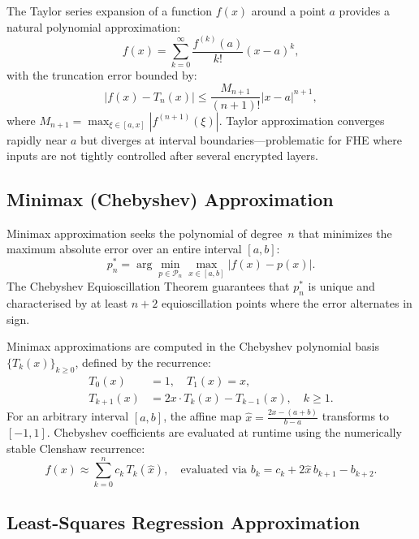 The Taylor series expansion of a function $f(x)$ around a point $a$ provides a natural polynomial approximation:
\begin{equation}
    f(x) = \sum_{k=0}^{\infty} \frac{f^{(k)}(a)}{k!}(x - a)^k,
    \label{eq:taylor_general}
\end{equation}
with the truncation error bounded by:
\begin{equation}
    \left| f(x) - T_n(x) \right| \leq \frac{M_{n+1}}{(n+1)!} |x - a|^{n+1},
    \label{eq:taylor_error}
\end{equation}
where $M_{n+1} = \max_{\xi \in [a, x]} |f^{(n+1)}(\xi)|$. Taylor approximation converges rapidly near $a$ but diverges at interval boundaries---problematic for FHE where inputs are not tightly controlled after several encrypted layers.

\subsection{Minimax (Chebyshev) Approximation}

Minimax approximation seeks the polynomial of degree~$n$ that minimizes the maximum absolute error over an entire interval $[a, b]$:
\begin{equation}
    p_n^* = \arg\min_{p \in \mathcal{P}_n} \max_{x \in [a, b]} |f(x) - p(x)|.
    \label{eq:minimax}
\end{equation}
The Chebyshev Equioscillation Theorem guarantees that $p_n^*$ is unique and characterised by at least $n+2$ equioscillation points where the error alternates in sign.

Minimax approximations are computed in the Chebyshev polynomial basis $\{T_k(x)\}_{k \geq 0}$, defined by the recurrence:
\begin{align}
    T_0(x) &= 1, \quad T_1(x) = x, \label{eq:cheb_base} \\
    T_{k+1}(x) &= 2x \cdot T_k(x) - T_{k-1}(x), \quad k \geq 1. \label{eq:cheb_recurrence}
\end{align}
For an arbitrary interval $[a, b]$, the affine map $\hat{x} = \frac{2x - (a+b)}{b - a}$ transforms to $[-1, 1]$. Chebyshev coefficients are evaluated at runtime using the numerically stable Clenshaw recurrence:
\begin{equation}
    f(x) \approx \sum_{k=0}^{n} c_k\, T_k(\hat{x}), \quad \text{evaluated via } b_k = c_k + 2\hat{x}\, b_{k+1} - b_{k+2}.
    \label{eq:clenshaw}
\end{equation}

\subsection{Least-Squares Regression Approximation}

